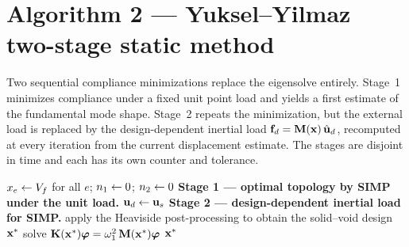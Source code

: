 \section{Algorithm 2 --- Yuksel--Yilmaz two-stage static method}

Two sequential compliance minimizations replace the eigensolve entirely.
Stage~1 minimizes compliance under a fixed unit point load and yields a first
estimate of the fundamental mode shape.  Stage~2 repeats the minimization,
but the external load is replaced by the design-dependent inertial load
$\mathbf{f}_d = \mathbf{M}(\mathbf{x})\,\hat{\mathbf{u}}_d$, recomputed at every iteration from
the current displacement estimate.  The stages are disjoint in time and each
has its own counter and tolerance.

\begin{algorithm}[htbp]
\DontPrintSemicolon
\caption{Yuksel--Yilmaz two-stage static method.}
\label{alg:yuksel}
\BlankLine
$x_e \leftarrow V_f$ for all $e$; \quad $n_1 \leftarrow 0$; \quad $n_2 \leftarrow 0$\;
\BlankLine
{}
\textbf{Stage 1 --- optimal topology by SIMP under the unit load.}\;
\BlankLine
$\mathbf{u}_d \leftarrow \mathbf{u}_s$ 
\BlankLine
{}
\textbf{Stage 2 --- design-dependent inertial load for SIMP.}\;
\BlankLine
apply the Heaviside post-processing to obtain the solid--void design
$\mathbf{x}^\ast$\;
solve $\mathbf{K}(\mathbf{x}^\ast)\bm{\varphi} = \omega_1^2\,\mathbf{M}(\mathbf{x}^\ast)\bm{\varphi}$
\Return $\mathbf{x}^\ast$\;
\end{algorithm}

